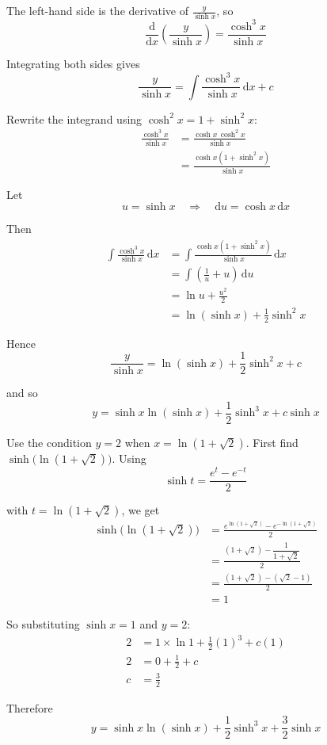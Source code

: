 \documentclass[leqno]{article}
\begin{document}
\begin{enumerate}[
  label=\textbf{\arabic*.},
  leftmargin=*,
  topsep=0pt,
  partopsep=0pt,
  parsep=0pt
]
\begin{djsSolution}
\begin{enumerate}[label=\textbf{(\alph*)}]
The left-hand side is the derivative of \(\frac{y}{\sinh x}\), so
\[
\frac{\mathrm{d}}{\mathrm{d}x}\left(\frac{y}{\sinh x}\right)=\frac{\cosh^3 x}{\sinh x}
\]

Integrating both sides gives
\[
\frac{y}{\sinh x}=\int \frac{\cosh^3 x}{\sinh x}\,\mathrm{d}x+c
\]

Rewrite the integrand using \(\cosh^2 x=1+\sinh^2 x\):
\begin{align*}
\frac{\cosh^3 x}{\sinh x}
&=\frac{\cosh x\,\cosh^2 x}{\sinh x} \\
&=\frac{\cosh x(1+\sinh^2 x)}{\sinh x}
\end{align*}

Let
\[
u=\sinh x
\quad\Longrightarrow\quad
\mathrm{d}u=\cosh x\,\mathrm{d}x
\]

Then
\begin{align*}
\int \frac{\cosh^3 x}{\sinh x}\,\mathrm{d}x
&=\int \frac{\cosh x(1+\sinh^2 x)}{\sinh x}\,\mathrm{d}x \\
&=\int \left(\frac{1}{u}+u\right)\,\mathrm{d}u \\
&=\ln u+\frac{u^2}{2} \\
&=\ln(\sinh x)+\frac{1}{2}\sinh^2 x
\end{align*}

Hence
\[
\frac{y}{\sinh x}=\ln(\sinh x)+\frac{1}{2}\sinh^2 x+c
\]

and so
\[
y=\sinh x\ln(\sinh x)+\frac{1}{2}\sinh^3 x+c\sinh x
\]

Use the condition \(y=2\) when \(x=\ln(1+\sqrt{2})\). First find \(\sinh\bigl(\ln(1+\sqrt{2})\bigr)\). Using
\[
\sinh t=\frac{e^t-e^{-t}}{2}
\]

with \(t=\ln(1+\sqrt{2})\), we get
\begin{align*}
\sinh\bigl(\ln(1+\sqrt{2})\bigr)
&=\frac{e^{\ln(1+\sqrt{2})}-e^{-\ln(1+\sqrt{2})}}{2} \\
&=\frac{(1+\sqrt{2})-\dfrac{1}{1+\sqrt{2}}}{2} \\
&=\frac{(1+\sqrt{2})-(\sqrt{2}-1)}{2} \\
&=1
\end{align*}

So substituting \(\sinh x=1\) and \(y=2\):
\begin{align*}
2&=1\times \ln 1+\frac{1}{2}(1)^3+c(1) \\
2&=0+\frac{1}{2}+c \\
c&=\frac{3}{2}
\end{align*}

Therefore
\[
y=\sinh x\ln(\sinh x)+\frac{1}{2}\sinh^3 x+\frac{3}{2}\sinh x
\]
\end{enumerate}
\end{djsSolution}



\end{enumerate}
\end{document}
